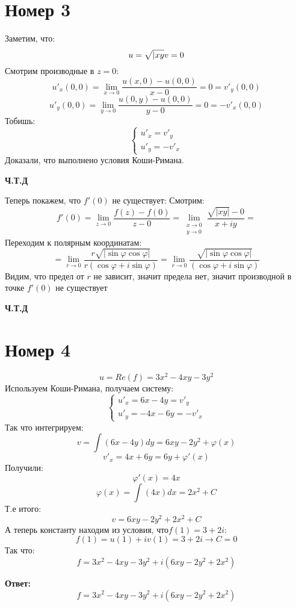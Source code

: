 \documentclass[a4paper,12pt]{article}
\begin{document}
\section*{Номер 3}
Заметим, что:
\[
u = \sqrt{|xy} \\
v = 0
\]
Смотрим производные в $z = 0$:
\[
u'_x(0, 0) = \lim_{x \rightarrow 0} \frac{u(x, 0) - u(0, 0)}{x - 0} = 0 = v'_y (0, 0)
\]
\[
u'_y(0, 0) = \lim_{y \rightarrow 0} \frac{u(0, y) - u(0, 0)}{y - 0} = 0 = -v'_x(0, 0)
\]
Тобишь:
\[
\begin{cases}
u'_x = v'_y \\
u'_y = -v'_x 
\end{cases}
\]
Доказали, что выполнено условия Коши-Римана.
\begin{center}
\textbf{Ч.Т.Д} 
\end{center}
 Теперь покажем, что $f'(0)$ не существует:
Смотрим:
\[ 
f'(0) = \lim\limits_{z \rightarrow 0 } \frac{f(z) - f(0)}{z - 0 } = 
\lim_{\begin{matrix}
x \rightarrow 0 \\
y \rightarrow 0
\end{matrix}}  \frac{\sqrt{|xy|} - 0}{x + iy} = 
\]
Переходим к полярным координатам:
\[
=
\lim_{r \rightarrow 0} \frac{r \sqrt{|\sin \varphi \cos \varphi |}}{r(\cos \varphi + i \sin\varphi )} = 
\lim_{r \rightarrow 0} \frac{\sqrt{|\sin \varphi \cos \varphi |}}{(\cos\varphi + i \sin\varphi )}
\] 
Видим, что предел от $r$ не зависит, значит предела нет, значит производной в точке $f'(0)$ не существует 
\begin{center}
\textbf{Ч.Т.Д} 
\end{center}
\clearpage
\section*{Номер 4}
\[
u = Re(f) = 3x^2 - 4xy - 3y^2
\]
Используем Коши-Римана, получаем систему:
\[
\begin{cases}
u'_x = 6x - 4y = v'_y \\
u'_y = -4x -6y = -v'_x
\end{cases}
\]
Так что интегрируем:
\[
v = \int (6x -4y) dy = 6xy - 2y^2 + \varphi(x)
\]
\[
v'_x = 4x + 6y = 6y + \varphi'(x)
\]
Получили:
\[
\varphi'(x) = 4x 
\]
\[
\varphi(x) = \int (4x) dx = 2x^2 + C 
\]
Т.е итого:
\[
v = 6xy - 2y^2 + 2x^2 + C
\]
А теперь константу находим из условия, что$f(1) = 3 + 2i$:
\[
f(1) = u(1) + iv(1) = 3 + 2i  \rightarrow C = 0
\]
Так что:
\[
f = 3x^2 - 4xy - 3y^2+ i(6xy - 2y^2 + 2x^2)
\] 
\begin{center}
\textbf{Ответ: } 
\[
f = 3x^2 - 4xy - 3y^2+ i(6xy - 2y^2 + 2x^2)
\]
\end{center}
\clearpage
\end{document}
